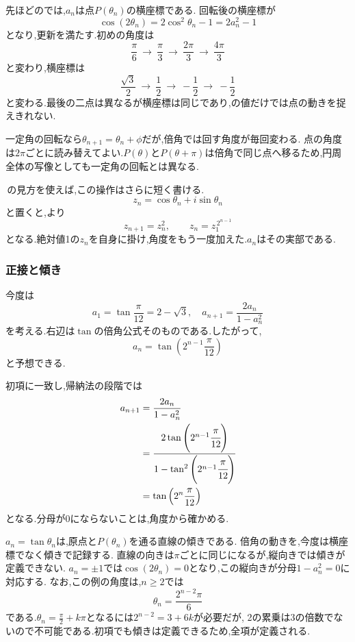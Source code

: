 先ほどのでは,$a_n$は点$P(\theta_n)$の横座標である.
回転後の横座標が
\[
  \cos(2\theta_n)=2\cos^2\theta_n-1=2a_n^2-1
\]
となり,更新を満たす.初めの角度は
\[
  \frac{\pi}{6}\ \longrightarrow\ \frac{\pi}{3}
  \ \longrightarrow\ \frac{2\pi}{3}
  \ \longrightarrow\ \frac{4\pi}{3}
\]
と変わり,横座標は
\[
  \frac{\sqrt{3}}{2}\ \longrightarrow\ \frac12
  \ \longrightarrow\ -\frac12
  \ \longrightarrow\ -\frac12
\]
と変わる.最後の二点は異なるが横座標は同じであり,の値だけでは点の動きを捉えきれない.

一定角の回転なら$\theta_{n+1}=\theta_n+\phi$だが,倍角では回す角度が毎回変わる.
点の角度は$2\pi$ごとに読み替えてよい.$P(\theta)$と$P(\theta+\pi)$は倍角で同じ点へ移るため,円周全体の写像としても一定角の回転とは異なる.

\,の見方を使えば,この操作はさらに短く書ける.
\[
  z_n=\cos\theta_n+i\sin\theta_n
\]
と置くと,より
\[
  z_{n+1}=z_n^2,\qquad z_n=z_1^{\,2^{n-1}}
\]
となる.絶対値1の$z_n$を自身に掛け,角度をもう一度加えた.$a_n$はその実部である.

\subsubsection{正接と傾き}\label{節：正接と傾き}
今度は
\[
  a_1=\tan\frac{\pi}{12}=2-\sqrt{3},
  \quad
  a_{n+1}=\frac{2a_n}{1-a_n^2}
\]
を考える.右辺は$\tan$の倍角公式そのものである.したがって,
\[
  a_n=\tan\left(2^{n-1}\frac{\pi}{12}\right)
\]
と予想できる.

初項に一致し,帰納法の段階では
\begin{align*}
  a_{n+1}
  &=\frac{2a_n}{1-a_n^2}\\
  &=\cfrac{2\tan\left(2^{n-1}\cfrac{\pi}{12}\right)}
  {1-\tan^2\left(2^{n-1}\cfrac{\pi}{12}\right)}\\
  &=\tan\left(2^n\frac{\pi}{12}\right)
\end{align*}
となる.分母が0にならないことは,角度から確かめる.

$a_n=\tan\theta_n$は,原点と$P(\theta_n)$を通る直線の傾きである.
倍角の動きを,今度は横座標でなく傾きで記録する.
直線の向きは$\pi$ごとに同じになるが,縦向きでは傾きが定義できない.
$a_n=\pm1$では$\cos(2\theta_n)=0$となり,この縦向きが分母$1-a_n^2=0$に対応する.
なお,この例の角度は,$n\geq2$では
\[
  \theta_n=\frac{2^{n-2}\pi}{6}
\]
である.$\displaystyle \theta_n=\frac{\pi}{2}+k\pi$となるには$2^{n-2}=3+6k$が必要だが,
2の累乗は3の倍数でないので不可能である.初項でも傾きは定義できるため,全項が定義される.

